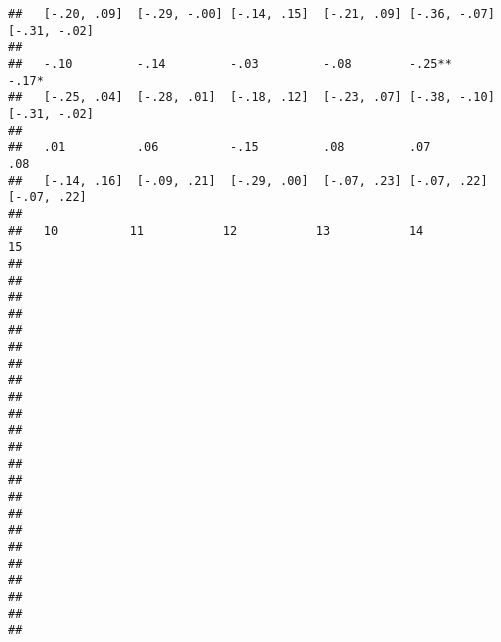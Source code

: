 \documentclass[
]{article}
\begin{document}
\begin{verbatim}
##   [-.20, .09]  [-.29, -.00] [-.14, .15]  [-.21, .09] [-.36, -.07] [-.31, -.02]
##                                                                               
##   -.10         -.14         -.03         -.08        -.25**       -.17*       
##   [-.25, .04]  [-.28, .01]  [-.18, .12]  [-.23, .07] [-.38, -.10] [-.31, -.02]
##                                                                               
##   .01          .06          -.15         .08         .07          .08         
##   [-.14, .16]  [-.09, .21]  [-.29, .00]  [-.07, .23] [-.07, .22]  [-.07, .22] 
##                                                                               
##   10          11           12           13           14           15          
##                                                                               
##                                                                               
##                                                                               
##                                                                               
##                                                                               
##                                                                               
##                                                                               
##                                                                               
##                                                                               
##                                                                               
##                                                                               
##                                                                               
##                                                                               
##                                                                               
##                                                                               
##                                                                               
##                                                                               
##                                                                               
##                                                                               
##                                                                               
##                                                                               
##                                                                               
##                                                                               

\end{verbatim}
\end{document}
